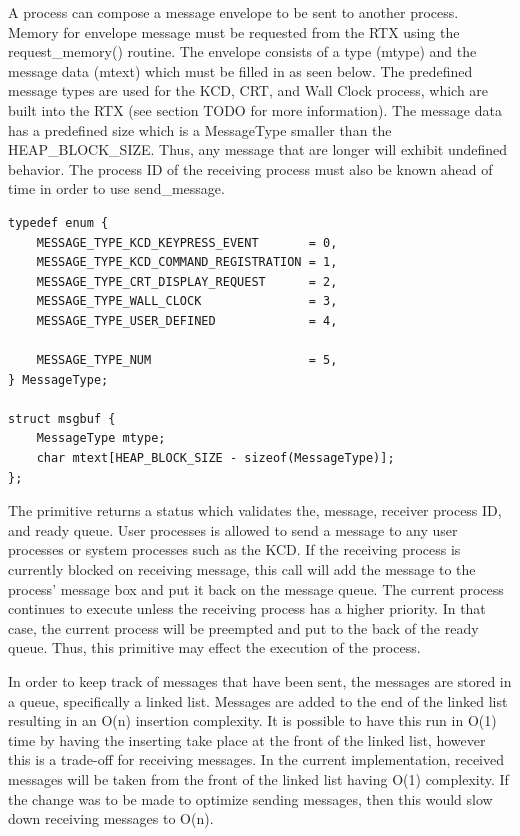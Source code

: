 \documentclass[12pt]{report}
\begin{document}
\par A process can compose a message envelope to be sent to another process. Memory for envelope message must be requested from the RTX using the request\_memory() routine. The envelope consists of a type (mtype) and the message data (mtext) which must be filled in as seen below. The predefined message types are used for the KCD, CRT, and Wall Clock process, which are built into the RTX (see section TODO for more information). The message data has a predefined size which is a MessageType smaller than the HEAP\_BLOCK\_SIZE. Thus, any message that are longer will exhibit undefined behavior. The process ID of the receiving process must also be known ahead of time in order to use send\_message.
\newline
\begin{lstlisting}
typedef enum {
    MESSAGE_TYPE_KCD_KEYPRESS_EVENT       = 0,
    MESSAGE_TYPE_KCD_COMMAND_REGISTRATION = 1,
    MESSAGE_TYPE_CRT_DISPLAY_REQUEST      = 2,
    MESSAGE_TYPE_WALL_CLOCK               = 3,
    MESSAGE_TYPE_USER_DEFINED             = 4,

    MESSAGE_TYPE_NUM                      = 5,
} MessageType;

struct msgbuf {
    MessageType mtype;
    char mtext[HEAP_BLOCK_SIZE - sizeof(MessageType)];
};
\end{lstlisting}
\par The primitive returns a status which validates the, message, receiver process ID, and ready queue. User processes is allowed to send a message to any user processes or system processes such as the KCD. If the receiving process is currently blocked on receiving message, this call will add the message to the process' message box and put it back on the message queue. The current process continues to execute unless the receiving process has a higher priority. In that case, the current process will be preempted and put to the back of the ready queue. Thus, this primitive may effect the execution of the process.

\par In order to keep track of messages that have been sent, the messages are stored in a queue, specifically a linked list. Messages are added to the end of the linked list resulting in an O(n) insertion complexity. It is possible to have this run in O(1) time by having the inserting take place at the front of the linked list, however this is a trade-off for receiving messages. In the current implementation, received messages will be taken from the front of the linked list having O(1) complexity. If the change was to be made to optimize sending messages, then this would slow down receiving messages to O(n).
\newline
\end{document}
